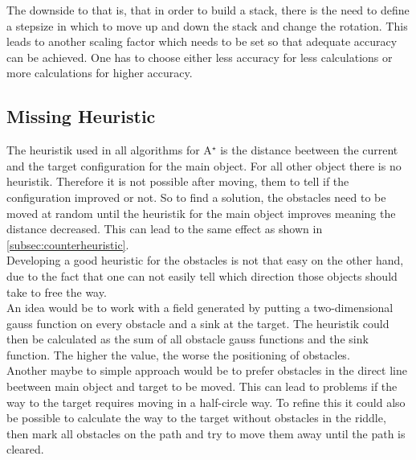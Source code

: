 The downside to that is, that in order to build a stack, there is the need to define a stepsize in which to move up and down the stack and change the rotation. This leads to another scaling factor which needs to be set so that adequate accuracy can be achieved. One has to choose either less accuracy for less calculations or more calculations for higher accuracy.

\subsection{Missing Heuristic}
The heuristik used in all algorithms for A$^\star$ is the distance beetween the current and the target configuration for the main object. For all other object there is no heuristik. Therefore it is not possible after moving, them to tell if the configuration improved or not. So to find a solution, the obstacles need to be moved at random until the heuristik for the main object improves meaning the distance decreased. This can lead to the same effect as shown in \ref{subsec:counterheuristic}.\\
Developing a good heuristic for the obstacles is not that easy on the other hand, due to the fact that one can not easily tell which direction those objects should take to free the way.\\
An idea would be to work with a field generated by putting a two-dimensional gauss function on every obstacle and a sink at the target. The heuristik could then be calculated as the sum of all obstacle gauss functions and the sink function. The higher the value, the worse the positioning of obstacles. \\
Another maybe to simple approach would be to prefer obstacles in the direct line beetween main object and target to be moved. This can lead to problems if the way to the target requires moving in a half-circle way. To refine this it could also be possible to calculate the way to the target without obstacles in the riddle, then mark all obstacles on the path and try to move them away until the path is cleared.

